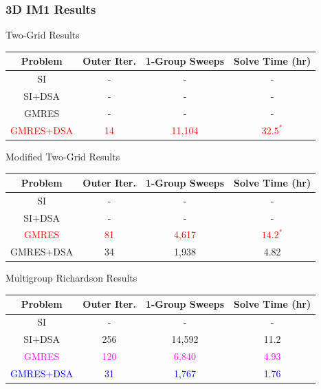 \documentclass[compress,10pt]{beamer}
\newcommand{\tcr}[1]{\textcolor{red}{#1}}
\newcommand{\tcb}[1]{\textcolor{blue}{#1}}
\newcommand{\tcm}[1]{\textcolor{magenta}{#1}}
\begin{document}
\begin{frame}[t]\frametitle{3D IM1 Results}{\footnotesize
\vspace{-2mm}
\begin{block}{Two-Grid Results}
\begin{table}
\begin{tabular}{|c|c|c|c|}
\hline
Problem & Outer Iter.  & 1-Group Sweeps & Solve Time (hr)  \\
\hline \hline
SI & - & -  & -  \\ \hline
SI+DSA & -  & - & -  \\ \hline
GMRES & -  & - & - \\ \hline
\tcr{GMRES+DSA} & \tcr{14} &  \tcr{11,104}  &  \tcr{$32.5^*$}  \\ \hline
\end{tabular}
\end{table}
\end{block}
\vspace{-2mm}
\begin{block}{Modified Two-Grid Results}
\begin{table}
\begin{tabular}{|c|c|c|c|}
\hline
Problem & Outer Iter.  & 1-Group Sweeps & Solve Time (hr)  \\
\hline \hline
SI & - &  - & -  \\ \hline
SI+DSA & -  & - & -  \\ \hline
\tcr{GMRES} & \tcr{81}  & \tcr{4,617 }& \tcr{$14.2^*$} \\ \hline
GMRES+DSA & 34 &  1,938  &  4.82  \\ \hline
\end{tabular}
\end{table}
\end{block}
\vspace{-2mm}
\begin{block}{Multigroup Richardson Results}
\begin{table}
\begin{tabular}{|c|c|c|c|}
\hline
Problem & Outer Iter. & 1-Group Sweeps & Solve Time (hr)  \\
\hline \hline
SI &  - & - & -  \\ \hline
SI+DSA & 256 &  14,592 & 11.2 \\ \hline
\tcm{GMRES} & \tcm{120} & \tcm{6,840} & \tcm{4.93} \\ \hline
\tcb{GMRES+DSA} & \tcb{31}& \tcb{1,767} & \tcb{1.76} \\ \hline
\end{tabular}
\end{table}
\end{block}
}
\end{frame}
\typeout{***********************************************************************************}
\end{document}
